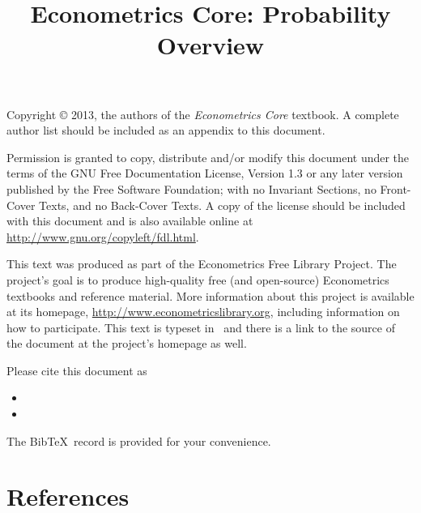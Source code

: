\documentclass{tex/tufte-handout}
\title{Econometrics Core: Probability Overview}
\begin{document}
\maketitle

\bigskip\noindent%
Copyright © 2013, the authors of the \textit{Econometrics Core}
textbook.  A complete author list should be included as an appendix to
this document.

Permission is granted to copy, distribute and/or modify this document
under the terms of the GNU Free Documentation License, Version 1.3 or
any later version published by the Free Software Foundation; with no
Invariant Sections, no Front-Cover Texts, and no Back-Cover Texts.  A
copy of the license should be included with this document and is also
available online at \url{http://www.gnu.org/copyleft/fdl.html}.

This text was produced as part of the Econometrics Free Library
Project.  The project's goal is to produce high-quality free (and
open-source) Econometrics textbooks and reference material.  More
information about this project is available at its homepage,
\url{http://www.econometricslibrary.org}, including information on how
to participate.  This text is typeset in \XeLaTeX\ and there is a link
to the source of the document at the project's homepage as well.

Please cite this document as
\begin{itemize}
\item[] 
\item[] 
\end{itemize}
The Bib\!\TeX\ record is provided for your convenience.

\tableofcontents
\newpage
{}
\setcounter{page}{1}









\part*{References}%

\end{document}
